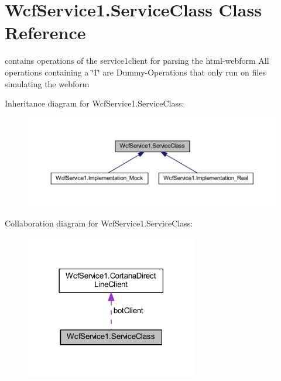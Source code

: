 \hypertarget{class_wcf_service1_1_1_service_class}{}\section{Wcf\+Service1.\+Service\+Class Class Reference}
\label{class_wcf_service1_1_1_service_class}


contains operations of the service1client for parsing the html-\/webform All operations containing a \char`\"{}1\char`\"{} are Dummy-\/\+Operations that only run on files simulating the webform  




Inheritance diagram for Wcf\+Service1.\+Service\+Class\+:\nopagebreak
\begin{figure}[H]
\begin{center}
\leavevmode
\includegraphics[width=350pt]{class_wcf_service1_1_1_service_class__inherit__graph}
\end{center}
\end{figure}


Collaboration diagram for Wcf\+Service1.\+Service\+Class\+:\nopagebreak
\begin{figure}[H]
\begin{center}
\leavevmode
\includegraphics[width=213pt]{class_wcf_service1_1_1_service_class__coll__graph}
\end{center}
\end{figure}
